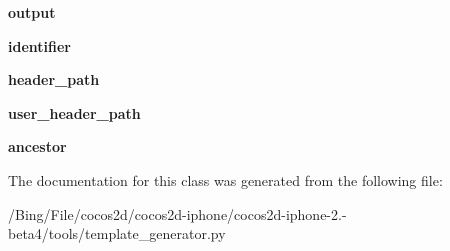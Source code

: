 \begin{DoxyCompactItemize}
\item 
\hypertarget{classtemplate__generator_1_1_xcode4_template_aca7441cab46d4330ccf483cad90eb2f5}{{\bfseries output}}\label{classtemplate__generator_1_1_xcode4_template_aca7441cab46d4330ccf483cad90eb2f5}

\item 
\hypertarget{classtemplate__generator_1_1_xcode4_template_ab53022488b20e2566f8c376c9819a4d1}{{\bfseries identifier}}\label{classtemplate__generator_1_1_xcode4_template_ab53022488b20e2566f8c376c9819a4d1}

\item 
\hypertarget{classtemplate__generator_1_1_xcode4_template_adbea3adb56d8060f4b1c4912219ab85a}{{\bfseries header\-\_\-path}}\label{classtemplate__generator_1_1_xcode4_template_adbea3adb56d8060f4b1c4912219ab85a}

\item 
\hypertarget{classtemplate__generator_1_1_xcode4_template_a1067121fe37dfbda430b7d52366f0db3}{{\bfseries user\-\_\-header\-\_\-path}}\label{classtemplate__generator_1_1_xcode4_template_a1067121fe37dfbda430b7d52366f0db3}

\item 
\hypertarget{classtemplate__generator_1_1_xcode4_template_a353b8e2d24ef626c3cc38c522a3c0e86}{{\bfseries ancestor}}\label{classtemplate__generator_1_1_xcode4_template_a353b8e2d24ef626c3cc38c522a3c0e86}

\end{DoxyCompactItemize}


The documentation for this class was generated from the following file\-:\begin{DoxyCompactItemize}
\item 
/\-Bing/\-File/cocos2d/cocos2d-\/iphone/cocos2d-\/iphone-\/2.-\/beta4/tools/template\-\_\-generator.\-py\end{DoxyCompactItemize}
